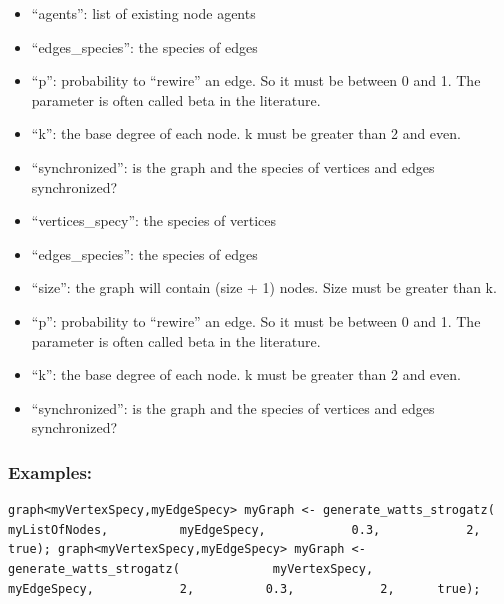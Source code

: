 \documentclass[]{book}
\providecommand{\tightlist}{%
  \setlength{\itemsep}{0pt}\setlength{\parskip}{0pt}}
\theoremstyle{definition}
\theoremstyle{definition}
\theoremstyle{definition}
\theoremstyle{remark}
\begin{document}
\begin{itemize}
\tightlist
\item
  ``agents'': list of existing node agents\\
\item
  ``edges\_species'': the species of edges\\
\item
  ``p'': probability to ``rewire'' an edge. So it must be between 0 and
  1. The parameter is often called beta in the literature.\\
\item
  ``k'': the base degree of each node. k must be greater than 2 and
  even.\\
\item
  ``synchronized'': is the graph and the species of vertices and edges
  synchronized?\\
\item
  ``vertices\_specy'': the species of vertices\\
\item
  ``edges\_species'': the species of edges\\
\item
  ``size'': the graph will contain (size + 1) nodes. Size must be
  greater than k.\\
\item
  ``p'': probability to ``rewire'' an edge. So it must be between 0 and
  1. The parameter is often called beta in the literature.\\
\item
  ``k'': the base degree of each node. k must be greater than 2 and
  even.\\
\item
  ``synchronized'': is the graph and the species of vertices and edges
  synchronized?
\end{itemize}

\subsubsection{Examples:}\label{examples-138}

\begin{verbatim}
graph<myVertexSpecy,myEdgeSpecy> myGraph <- generate_watts_strogatz(            myListOfNodes,          myEdgeSpecy,            0.3,            2,      true); graph<myVertexSpecy,myEdgeSpecy> myGraph <- generate_watts_strogatz(             myVertexSpecy,          myEdgeSpecy,            2,          0.3,            2,      true); 
\end{verbatim}
\end{document}
